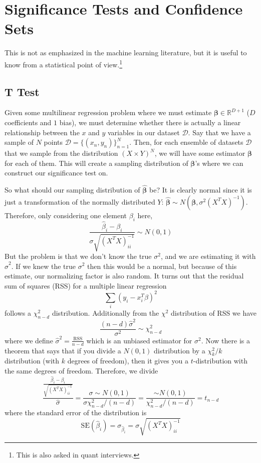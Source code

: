 \section{Significance Tests and Confidence Sets}

  This is not as emphasized in the machine learning literature, but it is useful to know from a statistical point of view.\footnote{This is also asked in quant interviews.}

\subsection{T Test}

  Given some multilinear regression problem where we must estimate $\boldsymbol{\beta} \in \mathbb{R}^{D + 1}$ ($D$ coefficients and $1$ bias), we must determine whether there is actually a linear relationship between the $x$ and $y$ variables in our dataset $\mathcal{D}$. Say that we have a sample of $N$ points $\mathcal{D} = \{(x_n, y_n)\}_{n=1}^N$. Then, for each ensemble of datasets $\mathcal{D}$ that we sample from the distribution $(X \times Y)^N$, we will have some estimator $\boldsymbol{\beta}$ for each of them. This will create a sampling distribution of $\boldsymbol{\beta}$'s where we can construct our significance test on. 

  So what should our sampling distribution of $\hat{\boldsymbol{\beta}}$ be? It is clearly normal since it is just a transformation of the normally distributed $Y$: $\hat{\boldsymbol{\beta}} \sim N (\boldsymbol{\beta}, \sigma^2 (X^T X)^{-1})$. Therefore, only considering one element $\beta_i$ here, 
  \[\frac{\hat{\beta}_i - \beta_i}{\sigma \sqrt{ (X^T X)^{-1}_{ii}}} \sim N(0, 1)\]
  But the problem is that we don't know the true $\sigma^2$, and we are estimating it with $\hat{\sigma}^2$. If we knew the true $\sigma^2$ then this would be a normal, but because of this estimate, our normalizing factor is also random. It turns out that the residual sum of squares (RSS) for a multiple linear regression
  \[\sum_{i} (y_i - x_i^T \beta)^2 \]
  follows a $\chi^2_{n-d}$ distribution. Additionally from the $\chi^2$ distribution of RSS we have 
  \[\frac{(n - d) \hat{\sigma}^2}{\sigma^2} \sim \chi^2_{n-d}\]
  where we define $\hat{\sigma}^2 = \frac{\mathrm{RSS}}{n-d}$ which is an unbiased estimator for $\sigma^2$. Now there is a theorem that says that if you divide a $N(0, 1)$ distribution by a $\chi^2_k / k$ distribution (with $k$ degrees of freedom), then it gives you a $t$-distribution with the same degrees of freedom. Therefore, we divide 
  \[\frac{\frac{\hat{\beta}_i - \beta_i}{\sqrt{ (X^T X)^{-1}_{ii}}}}{\hat{\sigma}} = \frac{ \sigma \sim N(0, 1)}{\sigma \chi^2_{n-d} / (n-d)} = \frac{\sim N(0, 1)}{\chi^2_{n-d} / (n-d)} = t_{n-d}\]
  where the standard error of the distribution is 
  \[\mathrm{SE}(\hat{\beta}_i) = \sigma_{\hat{\beta}_i} = \sigma \sqrt{(X^T X)^{-1}_{ii}} \]

